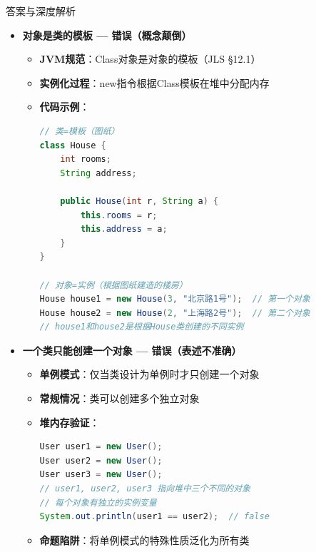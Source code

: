 \documentclass[12pt, a4paper]{ctexart}
\begin{document}
\begin{enumerate}[label=\textbf{\arabic*.}]
\begin{bluebox}{答案与深度解析}
\begin{itemize}[leftmargin=*, nosep, label={}]
			      \item[B] \textbf{对象是类的模板 — 错误（概念颠倒）}
			            \begin{itemize}[label={}, leftmargin=*, nosep]
				            \item \textbf{JVM规范}：Class对象是对象的模板（JLS §12.1）
				            \item \textbf{实例化过程}：new指令根据Class模板在堆中分配内存
				            \item \textbf{代码示例}：
				                  \begin{lstlisting}[language=Java]
// 类=模板（图纸）
class House {
    int rooms;
    String address;

    public House(int r, String a) {
        this.rooms = r;
        this.address = a;
    }
}

// 对象=实例（根据图纸建造的楼房）
House house1 = new House(3, "北京路1号");  // 第一个对象
House house2 = new House(2, "上海路2号");  // 第二个对象
// house1和house2是根据House类创建的不同实例
				            \end{lstlisting}
			            \end{itemize}

			      \item[C] \textbf{一个类只能创建一个对象 — 错误（表述不准确）}
			            \begin{itemize}[label={}, leftmargin=*, nosep]
				            \item \textbf{单例模式}：仅当类设计为单例时才只创建一个对象
				            \item \textbf{常规情况}：类可以创建多个独立对象
				            \item \textbf{堆内存验证}：
				                  \begin{lstlisting}[language=Java]
User user1 = new User();
User user2 = new User();
User user3 = new User();
// user1, user2, user3 指向堆中三个不同的对象
// 每个对象有独立的实例变量
System.out.println(user1 == user2);  // false
				            \end{lstlisting}
				            \item \textbf{命题陷阱}：将单例模式的特殊性质泛化为所有类
			            \end{itemize}


\end{itemize}
\end{bluebox}
\end{enumerate}
\end{document}
